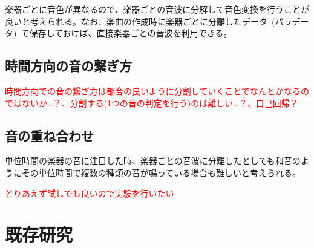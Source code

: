楽器ごとに音色が異なるので、楽器ごとの音波に分解して音色変換を行うことが良いと考えられる。なお、楽曲の作成時に楽器ごとに分離したデータ~(パラデータ)~で保存しておけば、直接楽器ごとの音波を利用できる。


\subsection{時間方向の音の繋ぎ方}

\textcolor{red}{時間方向での音の繋ぎ方は都合の良いように分割していくことでなんとかなるのではないか…？、分割する(1つの音の判定を行う)のは難しい…？、自己回帰？}

\subsection{音の重ね合わせ}

単位時間の楽器の音に注目した時、楽器ごとの音波に分離したとしても和音のようにその単位時間で複数の種類の音が鳴っている場合も難しいと考えられる。

\textcolor{red}{とりあえず試しでも良いので実験を行いたい}


\section{既存研究}

